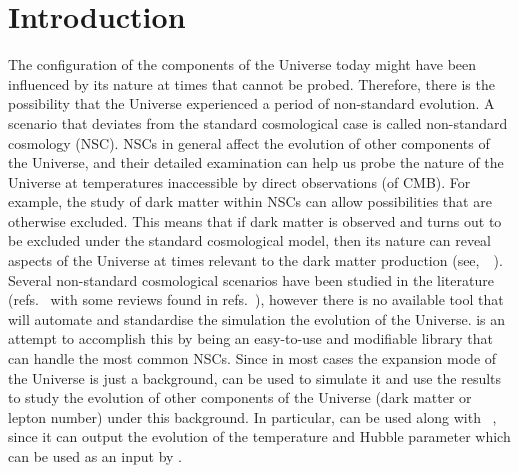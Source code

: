 \documentclass[11pt,a4paper]{article}
\begin{document}
\tableofcontents




\section{Introduction}\label{sec:intro}
\setcounter{equation}{0}
%
The configuration of the components of the Universe today might have been influenced by its nature at times that cannot be probed. Therefore, there is the possibility that the Universe experienced a period of non-standard evolution. A scenario that deviates from the standard cosmological case is called non-standard cosmology (NSC). 
%
NSCs in general affect the evolution of other components of the Universe, and their detailed examination can help us probe the nature of the Universe at temperatures inaccessible by direct observations (\eg of CMB). For example, the study of dark matter within NSCs can allow possibilities that are otherwise excluded. This means that if dark matter is observed and turns out to be excluded under the standard cosmological model, then its nature can reveal aspects of the Universe at times relevant to the dark matter production (see,~\eg~\cite{McDonald:1989jd,DEramo:2017gpl,Redmond:2017tja,DEramo:2017ecx,Bernal:2020bfj,Arias:2020qty,Arias:2021rer,Barman:2021ifu,Dienes:2021woi,Banerjee:2022fiw,Hardy:2018bph,Bernal:2018kcw,Arias:2019uol,Allahverdi:2019jsc,Bernal:2019mhf,Cosme:2020mck}). 
%
Several non-standard cosmological scenarios have been studied in the literature (\eg refs.~\cite{Vilenkin:1982wt,Coughlan:1983ci,Ratra:1987rm,Giudice:2000ex,Gardner:2004in,Dalianis:2018afb} with some reviews found in refs.~\cite{Tsujikawa:2013fta,Allahverdi:2020bys}), however there is no available tool that will automate and standardise the simulation the evolution of the Universe. \nsc is an attempt to accomplish this by being an easy-to-use and modifiable \CPP library that can handle the most common NSCs. 
%
Since in most cases the expansion mode of the Universe is just a background, \nsc can be used to simulate it and use the results to study the evolution of other components of the Universe (\eg dark matter or lepton number) under this background. 
%
In particular, \nsc can be used along with \mimes~\cite{Karamitros:2021nxi}, since it can output the evolution of the temperature and Hubble parameter which can be used as an input by \mimes.
\end{document}
